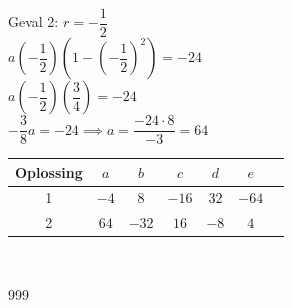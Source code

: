 \documentclass[a4paper]{article}
\begin{document}
Geval 2: $r = -\dfrac{1}{2}$ \\

$a(-\dfrac{1}{2})(1 - (-\dfrac{1}{2})^2) = -24$ \\

$a(-\dfrac{1}{2})(\dfrac{3}{4}) = -24$ \\

$-\dfrac{3}{8}a = -24 \implies a = \dfrac{-24 \cdot 8}{-3} = 64$ \\

\begin{tabular}{|c|c|c|c|c|c|c|} 
\hline 
Oplossing & $a$  & $b$   & $c$   & $d$  & $e$ \\
\hline 
1         & $-4$ & $8$   & $-16$ & $32$ & $-64$ \\
\hline 
2         & $64$ & $-32$ & $16$  & $-8$ & $4$ \\
\hline
\end{tabular} \\

\begin{thebibliography}{999}
\end{thebibliography}
\end{document}
